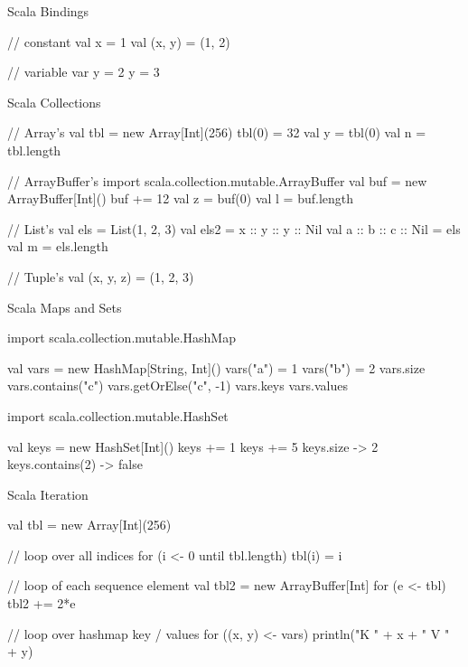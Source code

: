 \begin{frame}[fragile]{Scala Bindings}
\begin{scala}
// constant
val x = 1
val (x, y) = (1, 2)

// variable
var y = 2
y = 3
\end{scala}
\end{frame}

\begin{frame}[fragile]{Scala Collections}
\begin{scala}
// Array's
val tbl = new Array[Int](256)
tbl(0) = 32
val y = tbl(0)
val n = tbl.length

// ArrayBuffer's
import scala.collection.mutable.ArrayBuffer
val buf = new ArrayBuffer[Int]()
buf += 12
val z = buf(0)
val l = buf.length

// List's
val els = List(1, 2, 3)
val els2 = x :: y :: y :: Nil
val a :: b :: c :: Nil = els
val m = els.length

// Tuple's
val (x, y, z) = (1, 2, 3)
\end{scala}
\end{frame}

\begin{frame}[fragile]{Scala Maps and Sets}
\begin{scala}
import scala.collection.mutable.HashMap

val vars = new HashMap[String, Int]()
vars("a") = 1
vars("b") = 2
vars.size
vars.contains("c")
vars.getOrElse("c", -1)
vars.keys
vars.values
\end{scala}

\begin{scala}
import scala.collection.mutable.HashSet

val keys = new HashSet[Int]()
keys += 1
keys += 5
keys.size -> 2
keys.contains(2) -> false
\end{scala}
\end{frame}



\begin{frame}[fragile]{Scala Iteration}
\begin{scala}
val tbl = new Array[Int](256)

// loop over all indices
for (i <- 0 until tbl.length)
  tbl(i) = i

// loop of each sequence element
val tbl2 = new ArrayBuffer[Int]
for (e <- tbl)
  tbl2 += 2*e

// loop over hashmap key / values
for ((x, y) <- vars) 
  println("K " + x + " V " + y)
\end{scala}


\end{frame}

